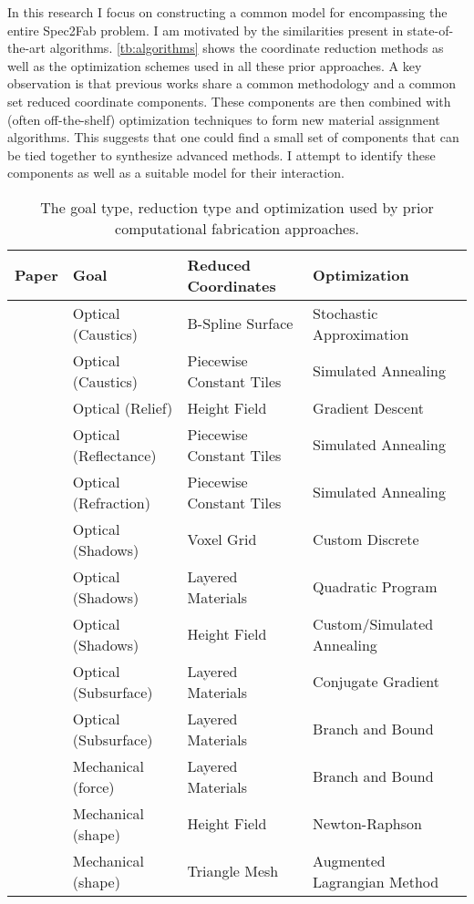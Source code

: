 In this research I focus on constructing a common model for encompassing the entire Spec2Fab problem.
I am motivated by the similarities present in state-of-the-art algorithms.
\autoref{tb:algorithms} shows the coordinate reduction methods as well as the optimization schemes
used in all these prior approaches.
A key observation is that previous works share a common methodology and  a common set reduced coordinate components. These components are then combined with (often off-the-shelf) optimization techniques
to form new material assignment algorithms.
This suggests that one could find a small set of components that can be tied together to synthesize  advanced methods.
I attempt to identify these components as well as a suitable model for their interaction.

\begin{table*}[htp]
\centering
\begin{tabular}{clll}
\hline
\textbf{Paper} & \textbf{Goal} & \textbf{Reduced Coordinates}  & \textbf{Optimization} \\
\hline
~\cite{Finckh:2010} & Optical (Caustics) & B-Spline Surface & Stochastic Approximation \\
~\cite{Marios:2011} & Optical (Caustics) & Piecewise Constant Tiles & Simulated Annealing \\
~\cite{Alexa:2010:RAI}& Optical (Relief) & Height Field & Gradient Descent\\
~\cite{Weyrich:2009:FMF} &Optical (Reflectance)&Piecewise Constant Tiles& Simulated Annealing\\
~\cite{Papas:2012} & Optical (Refraction) & Piecewise Constant Tiles & Simulated Annealing \\
~\cite{Mitra:2009:SA}&Optical (Shadows)&Voxel Grid&Custom Discrete\\
~\cite{Baran:2012:MLA}&Optical (Shadows)& Layered Materials & Quadratic Program \\
~\cite{Bermano:2012} & Optical (Shadows) & Height Field & Custom/Simulated Annealing \\
~\cite{Dong:2010:FSS}&Optical (Subsurface) &Layered Materials&Conjugate Gradient\\
~\cite{Hasan:2010:PRO}& Optical (Subsurface) & Layered Materials & Branch and Bound\\
~\cite{Bickel:2010:DAF}& Mechanical (force) & Layered Materials  & Branch and Bound \\
~\cite{Bickel:2012} & Mechanical (shape) &  Height Field &  Newton-Raphson \\
~\cite{sko:2012}& Mechanical (shape) & Triangle Mesh & Augmented Lagrangian Method \\
\hline
\end{tabular}
\caption{The goal type, reduction type and optimization used by prior computational fabrication approaches.}
\label{tb:algorithms}
\end{table*}
